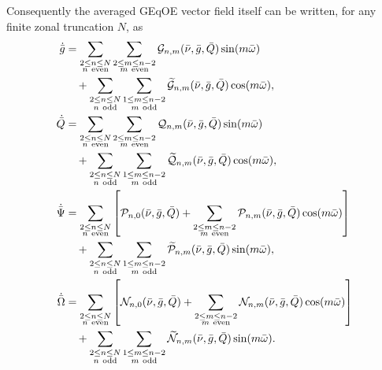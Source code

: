 \documentclass[11pt]{article}
\begin{document}
Consequently the averaged GEqOE vector field itself can be written, for any
finite zonal truncation $N$, as
\begin{align}
\dot{\bar g}
&=
\sum_{\substack{2\le n\le N\\ n\ \mathrm{even}}}
\sum_{\substack{2\le m\le n-2\\ m\ \mathrm{even}}}
\mathcal G_{n,m}(\bar\nu,\bar g,\bar Q)\sin(m\bar\omega)
\notag\\
&\quad+
\sum_{\substack{2\le n\le N\\ n\ \mathrm{odd}}}
\sum_{\substack{1\le m\le n-2\\ m\ \mathrm{odd}}}
\widetilde{\mathcal G}_{n,m}(\bar\nu,\bar g,\bar Q)\cos(m\bar\omega),
\label{eq:gdot_general_fourier}\\
\dot{\bar Q}
&=
\sum_{\substack{2\le n\le N\\ n\ \mathrm{even}}}
\sum_{\substack{2\le m\le n-2\\ m\ \mathrm{even}}}
\mathcal Q_{n,m}(\bar\nu,\bar g,\bar Q)\sin(m\bar\omega)
\notag\\
&\quad+
\sum_{\substack{2\le n\le N\\ n\ \mathrm{odd}}}
\sum_{\substack{1\le m\le n-2\\ m\ \mathrm{odd}}}
\widetilde{\mathcal Q}_{n,m}(\bar\nu,\bar g,\bar Q)\cos(m\bar\omega),
\label{eq:Qdot_general_fourier}\\
\dot{\bar\Psi}
&=
\sum_{\substack{2\le n\le N\\ n\ \mathrm{even}}}
\left[
\mathcal P_{n,0}(\bar\nu,\bar g,\bar Q)
+
\sum_{\substack{2\le m\le n-2\\ m\ \mathrm{even}}}
\mathcal P_{n,m}(\bar\nu,\bar g,\bar Q)\cos(m\bar\omega)
\right]
\notag\\
&\quad+
\sum_{\substack{2\le n\le N\\ n\ \mathrm{odd}}}
\sum_{\substack{1\le m\le n-2\\ m\ \mathrm{odd}}}
\widetilde{\mathcal P}_{n,m}(\bar\nu,\bar g,\bar Q)\sin(m\bar\omega),
\label{eq:Psidot_general_fourier}\\
\dot{\bar\Omega}
&=
\sum_{\substack{2\le n\le N\\ n\ \mathrm{even}}}
\left[
\mathcal N_{n,0}(\bar\nu,\bar g,\bar Q)
+
\sum_{\substack{2\le m\le n-2\\ m\ \mathrm{even}}}
\mathcal N_{n,m}(\bar\nu,\bar g,\bar Q)\cos(m\bar\omega)
\right]
\notag\\
&\quad+
\sum_{\substack{2\le n\le N\\ n\ \mathrm{odd}}}
\sum_{\substack{1\le m\le n-2\\ m\ \mathrm{odd}}}
\widetilde{\mathcal N}_{n,m}(\bar\nu,\bar g,\bar Q)\sin(m\bar\omega).
\label{eq:Omegadot_general_fourier}
\end{align}
\end{document}
